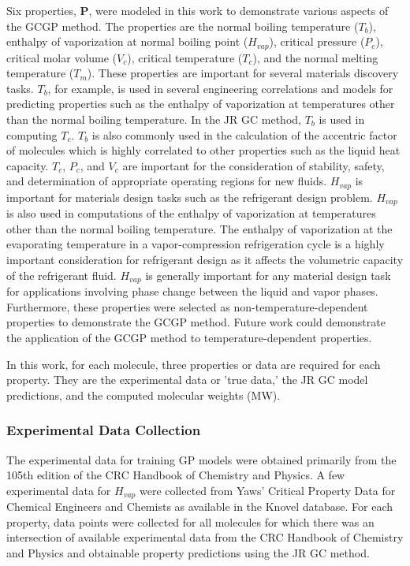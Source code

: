 \documentclass[journal=jacsat,manuscript=article]{achemso}
\begin{document}
Six properties, \textbf{P}, were modeled in this work to demonstrate various aspects of the GCGP method. The properties are the normal boiling temperature ($T_b$), enthalpy of vaporization at normal boiling point ($H_{vap}$), critical pressure ($P_c$), critical molar volume ($V_c$), critical temperature ($T_c$), and the normal melting temperature ($T_m$).
These properties are important for several materials discovery tasks. $T_b$, for example, is used in several engineering correlations and models for predicting properties such as the enthalpy of vaporization at temperatures other than the normal boiling temperature. In the JR GC method, $T_b$ is used in computing $T_c$. $T_b$ is also commonly used in the calculation of the accentric factor of molecules which is highly correlated to other properties such as the liquid heat capacity. 
$T_c$, $P_c$, and $V_c$ are important for the consideration of stability, safety, and determination of appropriate operating regions for new fluids. $H_{vap}$ is important for materials design tasks such as the refrigerant design problem. $H_{vap}$ is also used in computations of the enthalpy of vaporization at temperatures other than the normal boiling temperature. The enthalpy of vaporization at the evaporating temperature in a vapor-compression refrigeration cycle is a highly important consideration for refrigerant design as it affects the volumetric capacity of the refrigerant fluid. $H_{vap}$ is generally important for any material design task for applications involving phase change between the liquid and vapor phases.
Furthermore, these properties were selected as non-temperature-dependent properties to demonstrate the GCGP method. Future work could demonstrate the application of the GCGP method to temperature-dependent properties.

In this work, for each molecule, three properties or data are required for each property. They are the experimental data or 'true data,' the JR GC model predictions, and the computed molecular weights (MW).

\subsubsection{Experimental Data Collection}

The experimental data for training GP models were obtained primarily from the 105th edition of the CRC Handbook of Chemistry and Physics. A few experimental data for $H_{vap}$ were collected from Yaws' Critical Property Data for Chemical Engineers and Chemists as available in the Knovel database.
For each property, data points were collected for all molecules for which there was an intersection of available experimental data from the CRC Handbook of Chemistry and Physics and obtainable property predictions using the JR GC method.
\end{document}
